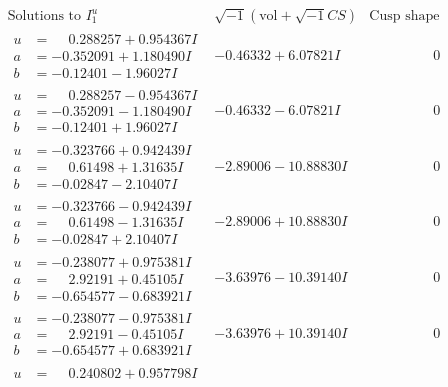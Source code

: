 \documentclass[1p]{elsarticle_modified}
\theoremstyle{definition}
\newcommand{\I}{\sqrt{-1}}
\begin{document}
$$\begin{array}{c|c|c}  
\text{Solutions to }I^u_{1}& \I (\text{vol} + \sqrt{-1}CS) & \text{Cusp shape}\\
 \hline 
\begin{aligned}
u &= \phantom{-}0.288257 + 0.954367 I \\
a &= -0.352091 + 1.180490 I \\
b &= -0.12401 - 1.96027 I\end{aligned}
 & -0.46332 + 6.07821 I & \phantom{-0.000000 } 0 \\ \hline\begin{aligned}
u &= \phantom{-}0.288257 - 0.954367 I \\
a &= -0.352091 - 1.180490 I \\
b &= -0.12401 + 1.96027 I\end{aligned}
 & -0.46332 - 6.07821 I & \phantom{-0.000000 } 0 \\ \hline\begin{aligned}
u &= -0.323766 + 0.942439 I \\
a &= \phantom{-}0.61498 + 1.31635 I \\
b &= -0.02847 - 2.10407 I\end{aligned}
 & -2.89006 - 10.88830 I & \phantom{-0.000000 } 0 \\ \hline\begin{aligned}
u &= -0.323766 - 0.942439 I \\
a &= \phantom{-}0.61498 - 1.31635 I \\
b &= -0.02847 + 2.10407 I\end{aligned}
 & -2.89006 + 10.88830 I & \phantom{-0.000000 } 0 \\ \hline\begin{aligned}
u &= -0.238077 + 0.975381 I \\
a &= \phantom{-}2.92191 + 0.45105 I \\
b &= -0.654577 - 0.683921 I\end{aligned}
 & -3.63976 - 10.39140 I & \phantom{-0.000000 } 0 \\ \hline\begin{aligned}
u &= -0.238077 - 0.975381 I \\
a &= \phantom{-}2.92191 - 0.45105 I \\
b &= -0.654577 + 0.683921 I\end{aligned}
 & -3.63976 + 10.39140 I & \phantom{-0.000000 } 0 \\ \hline\begin{aligned}
u &= \phantom{-}0.240802 + 0.957798 I \\

\end{aligned}
\end{array}$$
\end{document}
